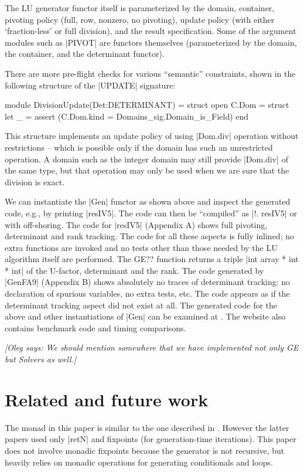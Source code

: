 \documentclass[draft]{elsart}
\newcommand{\oleg}[1]{{\it [Oleg says: #1]}}
\begin{document}
The LU generator functor itself is 
parameterized by the domain, container, pivoting policy (full, row,
nonzero, no pivoting), update policy (with either `fraction-less'
or full division), and the result specification. Some of the
argument modules such as |PIVOT| are functors themselves (parameterized
by the domain, the container, and the determinant functor). 

There are more pre-flight checks for various ``semantic'' 
constraints, shown
in the following structure of the |UPDATE| signature:
\vspace*{-5pt}\begin{code}
module DivisionUpdate(Det:DETERMINANT) =
  struct
  open C.Dom = struct 
  let _ = assert (C.Dom.kind = Domains_sig.Domain_is_Field)
end
\end{code}
%
This structure implements an update policy of using
|Dom.div| operation without restrictions -- which is possible only if
the domain has such an unrestricted operation. A domain such as the integer
domain may still provide |Dom.div| of the same type, but that operation may
only be used when we are sure that the division is exact. 


We can instantiate the |Gen| functor as shown above and inspect the generated
code, e.g., by printing |resIV5|. The code can then be ``compiled'' as 
|!. resIV5| or with off-shoring. The code for |resIV5| (Appendix A) shows
full pivoting, determinant and rank tracking. The code for all these aspects is
fully inlined; no extra functions are invoked and no tests other than those
needed by the LU algorithm itself are performed. The GE?? function returns a
triple |int array * int * int| of the U-factor, determinant and the rank. The
code generated by |GenFA9| (Appendix B) shows absolutely no traces of
determinant tracking: no declaration of spurious variables, no extra tests,
etc. The code appears as if the determinant tracking aspect did not exist
at all. The generated code for the above and other instantiations of
|Gen| can be examined at \cite{metamonadsURL}. The website also 
contains benchmark code and timing comparisons.

\oleg{We should mention somewhere that we have implemented not only GE
  but Solvers as well.}

\section{Related and future work}\label{related}

The monad in this paper is similar to the one described in
\cite{MSP:PADL04,KiselyovTaha}.  However the latter papers used only
|retN| and fixpoints (for generation-time iterations).  This paper
does not involve monadic fixpoints because the generator is not
recursive, but heavily relies on monadic operations for generating
conditionals and loops.
\end{document}

